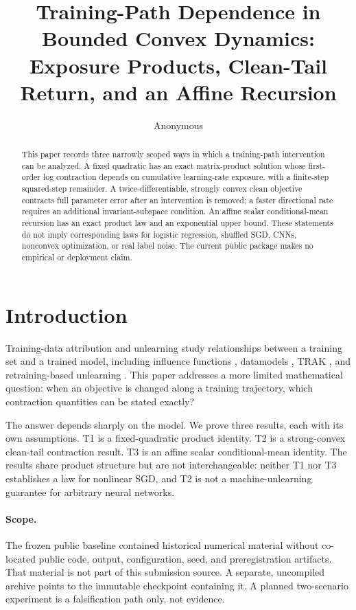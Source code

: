 \documentclass{article}
\title{Training-Path Dependence in Bounded Convex Dynamics:\\
Exposure Products, Clean-Tail Return, and an Affine Recursion}
\author{Anonymous}
\begin{document}
\maketitle

\begin{abstract}
This paper records three narrowly scoped ways in which a training-path
intervention can be analyzed. A fixed quadratic has an exact matrix-product
solution whose first-order log contraction depends on cumulative
learning-rate exposure, with a finite-step squared-step remainder. A
twice-differentiable, strongly convex clean objective contracts full
parameter error after an intervention is removed; a faster directional rate
requires an additional invariant-subspace condition. An affine scalar
conditional-mean recursion has an exact product law and an exponential upper
bound. These statements do not imply corresponding laws for logistic
regression, shuffled SGD, CNNs, nonconvex optimization, or real label noise.
The current public package makes no empirical or deployment claim.
\end{abstract}

\section{Introduction}
\label{sec:intro}

Training-data attribution and unlearning study relationships between a training
set and a trained model, including influence functions
\citep{koh2017understanding}, datamodels \citep{ilyas2022datamodels},
TRAK \citep{park2023trak}, and retraining-based unlearning
\citep{bourtoule2021sisa}. This paper addresses a more limited mathematical
question: when an objective is changed along a training trajectory, which
contraction quantities can be stated exactly?

The answer depends sharply on the model. We prove three results, each with its
own assumptions. T1 is a fixed-quadratic product identity. T2 is a
strong-convex clean-tail contraction result. T3 is an affine scalar
conditional-mean identity. The results share product structure but are not
interchangeable: neither T1 nor T3 establishes a law for nonlinear SGD, and
T2 is not a machine-unlearning guarantee for arbitrary neural networks.

\paragraph{Scope.}
The frozen public baseline contained historical numerical material without
co-located public code, output, configuration, seed, and preregistration
artifacts. That material is not part of this submission source. A separate,
uncompiled archive points to the immutable checkpoint containing it. A planned
two-scenario experiment is a falsification path only, not evidence.
\end{document}

